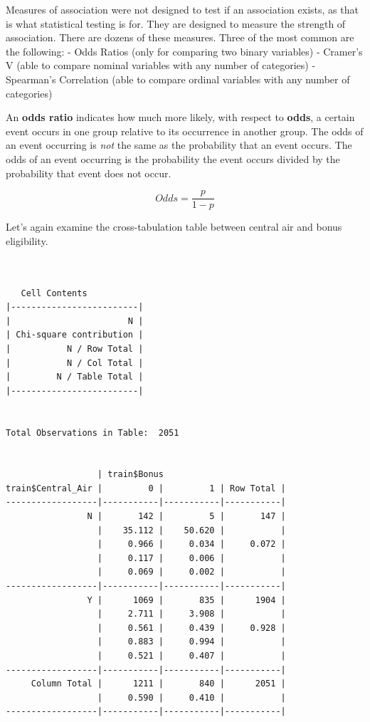 \documentclass[
  letterpaper,
  DIV=11,
  numbers=noendperiod]{scrreprt}
\begin{document}
Measures of association were not designed to test if an association
exists, as that is what statistical testing is for. They are designed to
measure the strength of association. There are dozens of these measures.
Three of the most common are the following: - Odds Ratios (only for
comparing two binary variables) - Cramer's V (able to compare nominal
variables with any number of categories) - Spearman's Correlation (able
to compare ordinal variables with any number of categories)

An \textbf{odds ratio} indicates how much more likely, with respect to
\textbf{odds}, a certain event occurs in one group relative to its
occurrence in another group. The odds of an event occurring is
\emph{not} the same as the probability that an event occurs. The odds of
an event occurring is the probability the event occurs divided by the
probability that event does not occur.

\[
Odds = \frac{p}{1-p}
\]

Let's again examine the cross-tabulation table between central air and
bonus eligibility.

\begin{verbatim}

 
   Cell Contents
|-------------------------|
|                       N |
| Chi-square contribution |
|           N / Row Total |
|           N / Col Total |
|         N / Table Total |
|-------------------------|

 
Total Observations in Table:  2051 

 
                  | train$Bonus 
train$Central_Air |         0 |         1 | Row Total | 
------------------|-----------|-----------|-----------|
                N |       142 |         5 |       147 | 
                  |    35.112 |    50.620 |           | 
                  |     0.966 |     0.034 |     0.072 | 
                  |     0.117 |     0.006 |           | 
                  |     0.069 |     0.002 |           | 
------------------|-----------|-----------|-----------|
                Y |      1069 |       835 |      1904 | 
                  |     2.711 |     3.908 |           | 
                  |     0.561 |     0.439 |     0.928 | 
                  |     0.883 |     0.994 |           | 
                  |     0.521 |     0.407 |           | 
------------------|-----------|-----------|-----------|
     Column Total |      1211 |       840 |      2051 | 
                  |     0.590 |     0.410 |           | 
------------------|-----------|-----------|-----------|

 
\end{verbatim}
\end{document}
